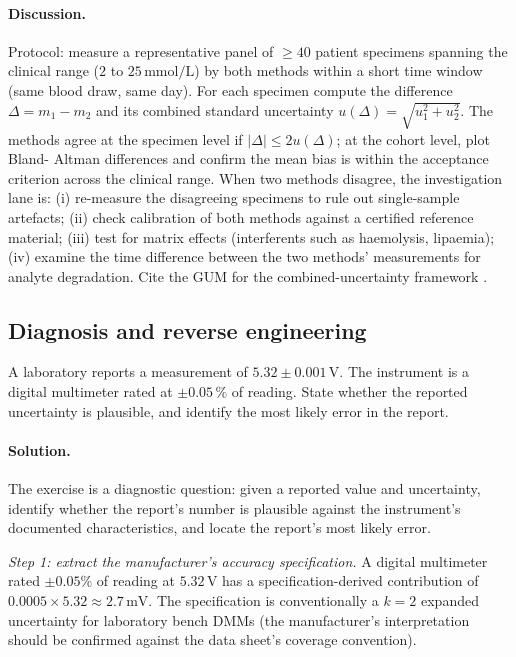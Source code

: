 \paragraph{Discussion.}
Protocol: measure a representative panel of $\geq 40$ patient
specimens spanning the clinical range ($2$ to $25 \,\si{\milli
\mol\per\liter}$) by both methods within a short time window
(same blood draw, same day). For each specimen compute the
difference $\Delta = m_{1} - m_{2}$ and its combined standard
uncertainty $u(\Delta) = \sqrt{u_{1}^{2} + u_{2}^{2}}$. The
methods agree at the specimen level if
$|\Delta| \leq 2 u(\Delta)$; at the cohort level, plot Bland-
Altman differences and confirm the mean bias is within the
acceptance criterion across the clinical range. When two methods
disagree, the investigation lane is: (i) re-measure the disagreeing
specimens to rule out single-sample artefacts; (ii) check
calibration of both methods against a certified reference material;
(iii) test for matrix effects (interferents such as haemolysis,
lipaemia); (iv) examine the time difference between the two
methods' measurements for analyte degradation. Cite the GUM for
the combined-uncertainty framework
\cite{std:iso-iec-guide98}.

\subsection*{Diagnosis and reverse engineering}

\begin{exercise}
A laboratory reports a measurement of $5.32 \pm 0.001 \,\si
{\volt}$. The instrument is a digital multimeter rated at $\pm
0.05\,\%$ of reading. State whether the reported uncertainty is
plausible, and identify the most likely error in the report.
\end{exercise}

\paragraph{Solution.}
The exercise is a diagnostic question: given a reported value and
uncertainty, identify whether the report's number is plausible
against the instrument's documented characteristics, and locate
the report's most likely error.

\emph{Step 1: extract the manufacturer's accuracy specification.}
A digital multimeter rated $\pm 0.05\%$ of reading at
$5.32\,\si{\volt}$ has a specification-derived contribution of
$0.0005 \times 5.32 \approx 2.7\,\si{\milli\volt}$. The
specification is conventionally a $k = 2$ expanded uncertainty for
laboratory bench DMMs (the manufacturer's interpretation should
be confirmed against the data sheet's coverage convention).


